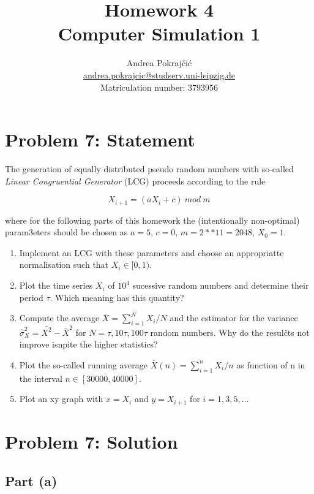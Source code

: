 \documentclass[11pt]{article}
\title{Homework 4\\[0.5ex]\large Computer Simulation 1}
\author{Andrea Pokraj\v{c}i\'{c}\\
    \normalsize\href{mailto:andrea.pokrajcic@studserv.uni-leipzig.de}{andrea.pokrajcic@studserv.uni-leipzig.de}\\
    \normalsize Matriculation number: 3793956}
\date{}
\begin{document}
    
    \maketitle
    
    

    
    \section*{Problem 7: Statement}\label{problem-7-statement}

The generation of equally distributed pseudo random numbers with
so-called \emph{Linear Congruential Generator} (LCG) proceeds according
to the rule

\[ X_{i+1}= (aX_i +c)\ mod \ m \]

where for the following parts of this homework the (intentionally
non-optimal) param3eters should be chosen as \(a=5\), \(c=0\),
\(m=2**11=2048\), \(X_0=1\).

\begin{enumerate}
\def\labelenumi{(\alph{enumi})}
\item
  Implement an LCG with these parameters and choose an appropriatte
  normalisation such that \(X_i \in [0,1)\).
\item
  Plot the time series \(X_i\) of \(10^4\) sucessive random numbers and
  determine their period \(\tau\). Which meaning has this quantity?
\item
  Compute the average \(\bar{X} =  \sum_{i=1}^N X_i/N\) and the
  estimator for the variance \(\hat{\sigma}_X^2=\bar{X^2}-\bar{X}^2\)
  for \(N = \tau , 10\tau, 100\tau\) random numbers. Why do the resulčts
  not improve isnpite the higher statistics?
\item
  Plot the so-called running average \(\bar{X} (n) =\sum_{i=1}^n X_i/n\)
  as function of n in the interval \(n \in [30 000, 40 000]\).
\item
  Plot an xy graph with \(x= X_i\) and \(y=X_{i+1}\) for \(i=1,3,5,...\)
\end{enumerate}

    \section*{Problem 7: Solution}\label{problem-7-solution}

    \subsection*{Part (a)}
\end{document}
